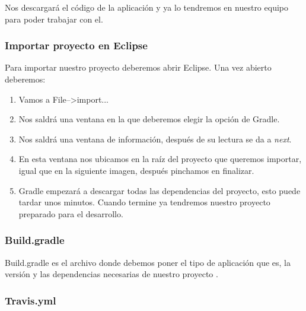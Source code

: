 
Nos descargará el código de la aplicación y ya lo tendremos en nuestro equipo para poder trabajar con el.

\subsubsection{Importar proyecto en Eclipse}\label{importar-proyecto-en-eclipse}

Para importar nuestro proyecto deberemos abrir Eclipse. Una vez abierto deberemos:

\begin{enumerate}
	\tightlist
	\item
	Vamos a File-->import...
	\item
	Nos saldrá una ventana en la que deberemos elegir la opción de Gradle.
	
	
	\newpage\item
	Nos saldrá una ventana de información, después de su lectura se da a \emph{next}.
	
\newpage	\item
	En esta ventana nos ubicamos en la raíz del proyecto que queremos importar, igual que en la siguiente imagen, después pinchamos en finalizar.
	
	
\newpage	\item
	Gradle empezará a descargar todas las dependencias del proyecto, esto puede tardar unos minutos. Cuando termine ya tendremos nuestro proyecto preparado para el desarrollo.
		
	
	
\end{enumerate}

\subsubsection{Build.gradle}\label{buildgradle}

Build.gradle es el archivo donde debemos poner el tipo de aplicación que es, la versión y las dependencias necesarias de nuestro proyecto \cite{gradle}.

\subsubsection{Travis.yml}\label{travis-yml}

